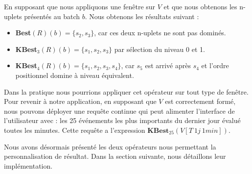 En supposant que nous appliquons une fenêtre sur $V$ et que nous obtenons les n-uplets présentés au batch $b$. Nous obtenons les résultats suivant : 
\begin{itemize}
	\item \textbf{Best}$(R)(b) = \{s_2,s_3\}$, car ces deux n-uplets ne sont pas dominés.
	\item \textbf{KBest}$_3(R)(b) = \{s_1,s_2,s_3\}$ par sélection du niveau 0 et 1.
	\item \textbf{KBest}$_4(R)(b) = \{s_1,s_2,s_3,s_4\}$, car $s_5$ est arrivé après $s_4$ et l'ordre positionnel domine à niveau équivalent.
\end{itemize}

Dans la pratique nous pourrions appliquer cet opérateur sur tout type de fenêtre. Pour revenir à notre application, en supposant que $V$ est correctement formé, nous pouvons déployer une requête continue qui peut alimenter l'interface de l'utilisateur avec : les 25 événements les plus importants du dernier jour évalué toutes les minutes. Cette requête a l'expression $\textbf{KBest}_{25}(V[T\ 1j\ 1min])$.

Nous avons désormais présenté les deux opérateurs nous permettant la personnalisation de résultat. Dans la section suivante, nous détaillons leur implémentation.